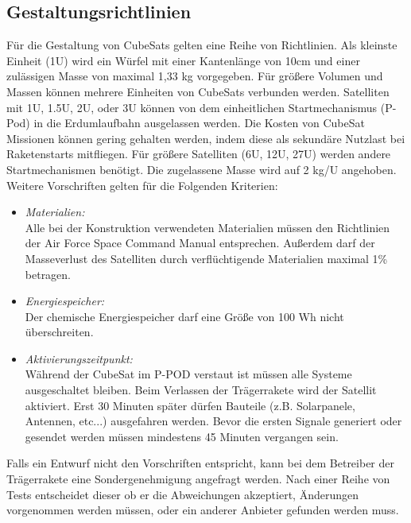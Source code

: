 	\subsection{Gestaltungsrichtlinien}%
Für die Gestaltung von CubeSats gelten eine Reihe von Richtlinien. Als kleinste Einheit (1U) wird ein Würfel mit einer Kantenlänge von 10cm und einer zulässigen Masse von maximal 1,33 kg vorgegeben. Für größere Volumen und Massen können mehrere Einheiten von CubeSats verbunden werden. Satelliten mit 1U, 1.5U, 2U, oder 3U können von dem einheitlichen Startmechanismus (P-Pod) in die Erdumlaufbahn ausgelassen werden. Die Kosten von CubeSat Missionen können gering gehalten werden, indem diese als sekundäre Nutzlast bei Raketenstarts mitfliegen. Für größere Satelliten (6U, 12U, 27U) werden andere Startmechanismen benötigt. Die zugelassene Masse wird auf 2 kg/U angehoben. Weitere Vorschriften gelten für die Folgenden Kriterien:
		\begin{itemize}
			\item \textit{Materialien:} 	\\ Alle bei der Konstruktion verwendeten Materialien müssen den Richtlinien der Air Force Space Command Manual entsprechen. Außerdem darf der Masseverlust des Satelliten durch verflüchtigende Materialien maximal 1\% betragen.\cite{.c, CaliforniaPolytechnicStateUniversity.2014}
			\item \textit{Energiespeicher:} \\ Der chemische Energiespeicher darf eine Größe von 100 Wh nicht überschreiten.\cite{CaliforniaPolytechnicStateUniversity.2014} 
			\item \textit{Aktivierungszeitpunkt:} \\ Während der CubeSat im P-POD verstaut ist müssen alle Systeme ausgeschaltet bleiben. Beim Verlassen der Trägerrakete wird der Satellit aktiviert. Erst 30 Minuten später dürfen Bauteile (z.B. Solarpanele, Antennen, etc...) ausgefahren werden. Bevor die ersten Signale generiert oder gesendet werden müssen mindestens 45 Minuten vergangen sein.\cite{Hevner.2011} 
		\end{itemize}
Falls ein Entwurf nicht den Vorschriften entspricht, kann bei dem Betreiber der Trägerrakete eine Sondergenehmigung angefragt werden. Nach einer Reihe von Tests entscheidet dieser ob er die Abweichungen akzeptiert, Änderungen vorgenommen werden müssen, oder ein anderer Anbieter gefunden werden muss. \cite{CaliforniaPolytechnicStateUniversity.2014} 

